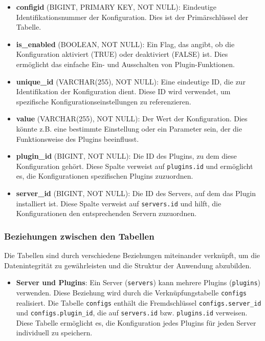 \begin{itemize}
\item
  \textbf{configid} (BIGINT, PRIMARY KEY, NOT NULL): Eindeutige Identifikationsnummer der Konfiguration. Dies ist der Primärschlüssel der Tabelle.
\item
  \textbf{is\_enabled} (BOOLEAN, NOT NULL): Ein Flag, das angibt, ob die Konfiguration aktiviert (TRUE) oder deaktiviert (FALSE) ist. Dies ermöglicht das einfache Ein- und Ausschalten von Plugin-Funktionen.
\item
  \textbf{unique\_id} (VARCHAR(255), NOT NULL): Eine eindeutige ID, die zur Identifikation der Konfiguration dient. Diese ID wird verwendet, um spezifische Konfigurationseinstellungen zu referenzieren.
\item
  \textbf{value} (VARCHAR(255), NOT NULL): Der Wert der Konfiguration. Dies könnte z.B. eine bestimmte Einstellung oder ein Parameter sein, der die Funktionsweise des Plugins beeinflusst.
\item
  \textbf{plugin\_id} (BIGINT, NOT NULL): Die ID des Plugins, zu dem diese Konfiguration gehört. Diese Spalte verweist auf \texttt{plugins.id} und ermöglicht es, die Konfigurationen spezifischen Plugins zuzuordnen.
\item
  \textbf{server\_id} (BIGINT, NOT NULL): Die ID des Servers, auf dem das Plugin installiert ist. Diese Spalte verweist auf \texttt{servers.id} und hilft, die Konfigurationen den entsprechenden Servern zuzuordnen.
\end{itemize}

\subsubsection{Beziehungen zwischen den Tabellen}\label{beziehungen-zwischen-den-tabellen}

Die Tabellen sind durch verschiedene Beziehungen miteinander verknüpft, um die Datenintegrität zu gewährleisten und die Struktur der Anwendung abzubilden.

\begin{itemize}
\item
  \textbf{Server und Plugins}: Ein Server (\texttt{servers}) kann mehrere Plugins (\texttt{plugins}) verwenden. Diese Beziehung wird durch die Verknüpfungstabelle \texttt{configs} realisiert. Die Tabelle \texttt{configs} enthält die Fremdschlüssel \texttt{configs.server\_id} und \texttt{configs.plugin\_id}, die auf \texttt{servers.id} bzw. \texttt{plugins.id} verweisen. Diese Tabelle ermöglicht es, die Konfiguration jedes Plugins für jeden Server individuell zu speichern.
\end{itemize}

